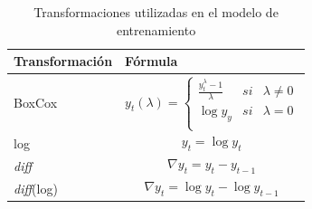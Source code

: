 \begin{table}[h]
	\centering
	\begin{tabular}{m{4cm} m{8cm}}
		\toprule
		\textbf{Transformación} & \textbf{\hspace{4cm}Fórmula}\\
		\midrule
		BoxCox			& 
		
		\begin{equation}
			\label{eqn:9}
			y_{t}(\lambda)= \left\{ \begin{array}{lcc}
				
				\frac{y_{t}^{\lambda} - 1}{\lambda} &   si  & \lambda \neq 0 \\
				\log{y_{y}} &  si & \lambda = 0 \\
				
			\end{array}
			\right.
		\end{equation}  
		\\ 
		log			&
		\begin{equation}
			\label{eqn:10}
			y_{t} = \log{y_{t}}
		\end{equation} \\
		\emph{diff} 			&
		\begin{equation}
			\label{eqn:11}
			\nabla y_{t} = y_{t} - y_{t-1}
		\end{equation}
		\\
		\emph{diff}(log)		& 
		\begin{equation}
			\label{eqn:12}
			\nabla y_{t} = \log{y_{t}} - \log{y_{t-1}}
		\end{equation}\\
		\bottomrule
		\hline
	\end{tabular}
	\caption{Transformaciones utilizadas en el modelo de entrenamiento}
	\label{tab:Table9}
\end{table}


